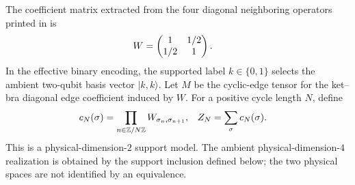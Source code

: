 \begin{definition}
    \label{def:cpsv_example411_binary_support_model}
    \leanok
    The coefficient matrix extracted from the four diagonal neighboring
    operators printed in
    \cite[Example~4.11, lines~907--924]{Cirac2016MPDO_arXiv} is
    \begin{align}
        W & =\begin{pmatrix}1&1/2\\1/2&1\end{pmatrix}.
        \notag
    \end{align}
    In the effective binary encoding, the supported label $k\in\{0,1\}$
    selects the ambient two-qubit basis vector $|k,k\rangle$.  Let $M$ be the
    cyclic-edge tensor for the ket--bra diagonal edge coefficient induced by
    $W$.  For a positive cycle length $N$, define
    \begin{align}
        c_N(\sigma) & =\prod_{n\in\mathbb Z/N\mathbb Z}
        W_{\sigma_n,\sigma_{n+1}},
                    & Z_N                               & =\sum_{\sigma}c_N(\sigma).
        \notag
    \end{align}
    This is a physical-dimension-$2$ support model.  The ambient
    physical-dimension-$4$ realization is obtained by the support inclusion
    defined below; the two physical spaces are not identified by an
    equivalence.
\end{definition}

